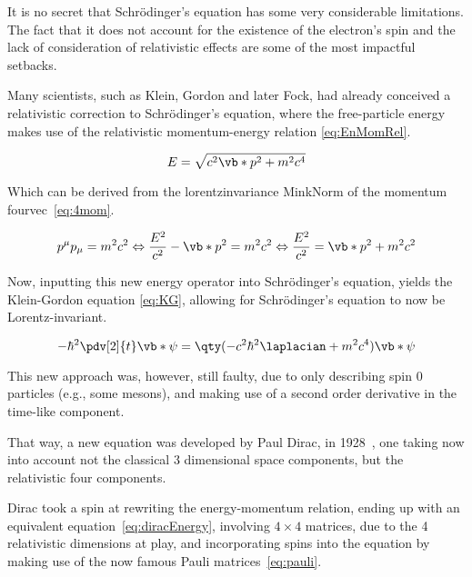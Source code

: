 It is no secret that Schrödinger's equation has some very considerable limitations. The fact that it does not account for the existence of the electron's spin and the lack of consideration of relativistic effects are some of the most impactful setbacks.




Many scientists, such as Klein, Gordon and later Fock, had already conceived a relativistic correction to Schrödinger's equation, where the free-particle energy makes use of the relativistic momentum-energy relation \eqref{eq:EnMomRel}.


 \begin{equation}
    E=\sqrt{c^2\vb*{p}^2+m^2c^4}
    \label{eq:EnMomRel}
 \end{equation}


 Which can be derived from the \gls{lorentzinvariance} \gls{MinkNorm} of the momentum \gls{fourvec}~\eqref{eq:4mom}.


 \begin{equation}
    p^\mu p_\mu = m^2c^2\Leftrightarrow\dfrac{E^2}{c^2}-\vb*{p}^2=m^2c^2 \Leftrightarrow  \dfrac{E^2}{c^2}= \vb*{p}^2 +m^2c^2
    \label{eq:4mom}
\end{equation}

 Now, inputting this new energy operator into Schrödinger's equation, yields the Klein-Gordon equation \eqref{eq:KG}, allowing for Schrödinger's equation to now be Lorentz-invariant.

 \begin{equation}
    -\hbar^2 \pdv[2]{t} \vb*{\psi}=\qty(-c^2\hbar^2\laplacian + m^2c^4)\vb*{\psi}
    \label{eq:KG}
\end{equation}



 This new approach was, however, still faulty, due to only describing spin 0 particles (e.g., some mesons), and making use of a second order derivative in the time-like component.

 That way, a new equation was developed by Paul Dirac, in 1928~\cite{Dirac}, one taking now into account not the classical 3 dimensional space components, but the relativistic four components.




 Dirac took a spin  at rewriting the energy-momentum relation, ending up with an equivalent equation~\eqref{eq:diracEnergy}, involving $4\times 4$ matrices, due to the 4 relativistic dimensions at play, and incorporating spins into the equation by making use of the now famous Pauli matrices~\eqref{eq:pauli}.

